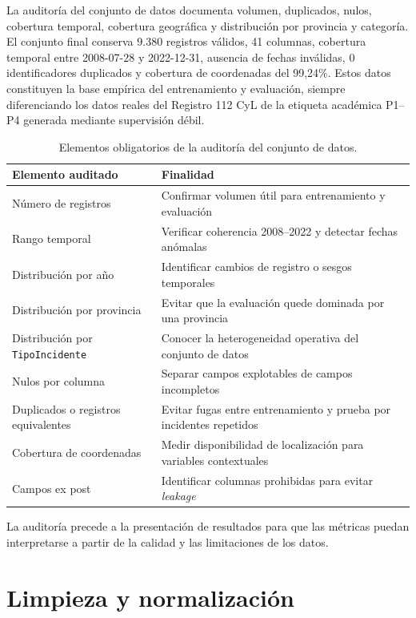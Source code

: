 La auditoría del conjunto de datos documenta volumen, duplicados, nulos, cobertura temporal, cobertura geográfica y distribución por provincia y categoría. El conjunto final conserva 9.380 registros válidos, 41 columnas, cobertura temporal entre 2008-07-28 y 2022-12-31, ausencia de fechas inválidas, 0 identificadores duplicados y cobertura de coordenadas del 99,24\%. Estos datos constituyen la base empírica del entrenamiento y evaluación, siempre diferenciando los datos reales del Registro 112 CyL de la etiqueta académica P1--P4 generada mediante supervisión débil.

\begin{table}[htbp]
\centering
\small
\begin{tabular}{|p{4.4cm}|p{8.4cm}|}
\hline
\textbf{Elemento auditado} & \textbf{Finalidad} \\ \hline
Número de registros & Confirmar volumen útil para entrenamiento y evaluación \\ \hline
Rango temporal & Verificar coherencia 2008--2022 y detectar fechas anómalas \\ \hline
Distribución por año & Identificar cambios de registro o sesgos temporales \\ \hline
Distribución por provincia & Evitar que la evaluación quede dominada por una provincia \\ \hline
Distribución por \texttt{TipoIncidente} & Conocer la heterogeneidad operativa del conjunto de datos \\ \hline
Nulos por columna & Separar campos explotables de campos incompletos \\ \hline
Duplicados o registros equivalentes & Evitar fugas entre entrenamiento y prueba por incidentes repetidos \\ \hline
Cobertura de coordenadas & Medir disponibilidad de localización para variables contextuales \\ \hline
Campos ex post & Identificar columnas prohibidas para evitar \textit{leakage} \\ \hline
\end{tabular}
\caption{Elementos obligatorios de la auditoría del conjunto de datos.}
\label{tab:auditoria-dataset-cap7}
\end{table}

La auditoría precede a la presentación de resultados para que las métricas puedan interpretarse a partir de la calidad y las limitaciones de los datos.

\section{Limpieza y normalización}

